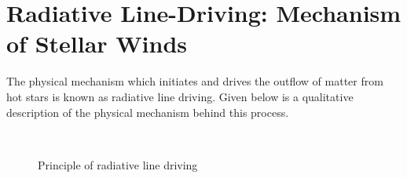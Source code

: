 	\section{Radiative Line-Driving: Mechanism of Stellar Winds} \label{tool:radiative-line-driving}
		The physical mechanism which initiates and drives the outflow of matter from hot stars is known as radiative line driving. Given below is a qualitative description of the physical mechanism behind this process.
		\begin{figure}[h!]
			\centering
			 \hfill
			 \hfill
			\\ %
			\caption{Principle of radiative line driving}
			\label{rad-line-drive-principle}
		\end{figure}
		
